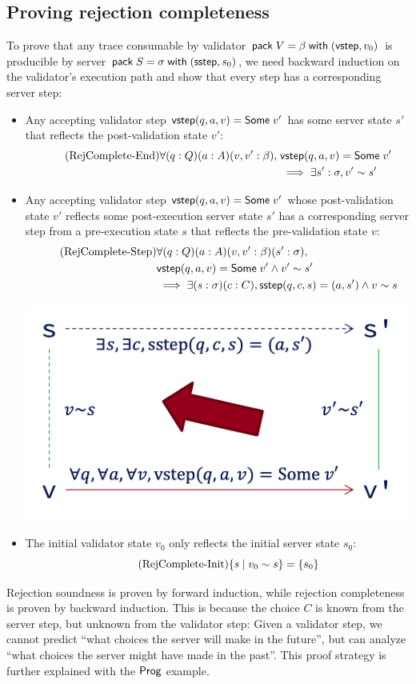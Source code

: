 \subsection{Proving rejection completeness}
To prove that any trace consumable by validator
$\mathsf{pack}\;V=\beta\;\mathsf{with}\;(\mathsf{vstep},v_0)$ is producible by server
$\mathsf{pack}\;S=\sigma\;\mathsf{with}\;(\mathsf{sstep},s_0)$, we need backward induction on the
validator's execution path and show that every step has a corresponding server
step:
\begin{itemize}
\item Any accepting validator step $\mathsf{vstep}(q,a,v)=\mathsf{Some}\;v'$ has some server
  state $s'$ that reflects the post-validation state $v'$:
  \begin{align*}
    \tag{RejComplete-End}
    \label{eq:rc1}
    \forall(q:Q)(a:A)(v, v':\beta),\;&\mathsf{vstep}(q,a,v)=\mathsf{Some}\;v'\\
    &\implies\exists s':\sigma,v'\sim s' 
  \end{align*}
\item Any accepting validator step $\mathsf{vstep}(q,a,v)=\mathsf{Some}\;v'$ whose
  post-validation state $v'$ reflects some post-execution server state $s'$
  has a corresponding server step from a pre-execution state $s$
  that reflects the pre-validation state $v$:
  \begin{align*}
    \tag{RejComplete-Step}
    \label{eq:rc2}
    &\forall(q:Q)(a:A)(v,v':\beta)(s':\sigma),\\
    &\mathsf{vstep}(q,a,v)=\mathsf{Some}\;v'\wedge v'\sim s'\\
    &\implies\exists(s:\sigma)(c:C),\mathsf{sstep}(q,c,s)=(a,s')\wedge v\sim s
  \end{align*}
  \begin{center}
    \includegraphics[width=.5\textwidth]{figures/complete}
  \end{center}

\item The initial validator state $v_0$ only reflects the initial server state $s_0$:
  \begin{equation}
    \tag{RejComplete-Init}
    \label{eq:rc3}
    \{s\mid v_0\sim s\}=\{s_0\}
  \end{equation}
\end{itemize}

Rejection soundness is proven by forward induction, while rejection completeness
is proven by backward induction.  This is because the choice $C$ is known from
the server step, but unknown from the validator step: Given a validator step, we
cannot predict ``what choices the server will make in the future'', but can
analyze ``what choices the server might have made in the past''.  This proof
strategy is further explained with the $\mathsf{Prog}$ example.
